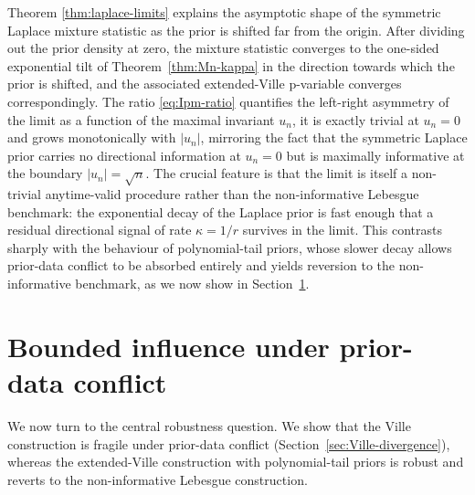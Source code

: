 \documentclass[12pt, a4paper]{report}
\newcommand{\1}{\mathbf{1}}
\begin{document}
\begin{remark}
Theorem \ref{thm:laplace-limits} explains the asymptotic shape of the symmetric Laplace mixture statistic as the prior is shifted far from the origin. After dividing out the prior density at zero, the mixture statistic converges to the one-sided exponential tilt of Theorem~\ref{thm:Mn-kappa} in the direction towards which the prior is shifted, and the associated extended-Ville p-variable converges correspondingly. The ratio \eqref{eq:Ipm-ratio} quantifies the left-right asymmetry of the limit as a function of the maximal invariant $u_n$, it is exactly trivial at $u_n=0$ and grows monotonically with $|u_n|$, mirroring the fact that the symmetric Laplace prior carries no directional information at $u_n=0$ but is maximally informative at the boundary $|u_n|=\sqrt n$. The crucial feature is that the limit is itself a non-trivial anytime-valid procedure rather than the non-informative Lebesgue benchmark: the exponential decay of the Laplace prior is fast enough that a residual directional signal of rate $\kappa = 1/r$ survives in the limit. This contrasts sharply with the behaviour of polynomial-tail priors, whose slower decay allows prior-data conflict to be absorbed entirely and yields reversion to the non-informative benchmark, as we now show in Section~\ref{sec:bdd-influence}.
\end{remark}


\section{Bounded influence under prior-data conflict}\label{sec:bdd-influence}
We now turn to the central robustness question. We show that the Ville construction is fragile under prior-data conflict (Section~\ref{sec:Ville-divergence}), whereas the extended-Ville
construction with polynomial-tail priors is robust and reverts to the non-informative Lebesgue construction.
\end{document}
